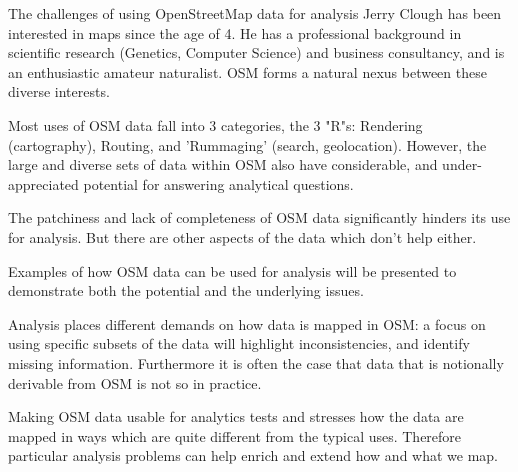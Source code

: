 %
{The challenges of using OpenStreetMap data for analysis}%
{Jerry Clough has been interested in maps since the age of 4. He has a professional background in scientific research (Genetics, Computer Science) and business consultancy, and is an enthusiastic amateur naturalist. OSM forms a natural nexus between these diverse interests. }%
{Most uses of OSM data fall into 3 categories, the 3 "R"s: Rendering (cartography), Routing, and 'Rummaging' (search, geolocation). However, the large and diverse sets of data within OSM also have considerable, and under-appreciated potential for answering analytical questions.

The patchiness and lack of completeness of OSM data significantly hinders its use for analysis.  But there are other aspects of the data which don't help either.

Examples of how OSM data can be used for analysis will be presented to demonstrate both the potential and the underlying issues.

Analysis places different demands on how data is mapped in OSM: a focus on using specific subsets of the data will highlight inconsistencies, and identify missing information. Furthermore it is often the case that data that is notionally derivable from OSM is not so in practice. 

Making OSM data usable for analytics tests and stresses how the data are mapped in ways which are quite different from the typical uses. Therefore particular analysis problems can help enrich and extend how and what we map.}
